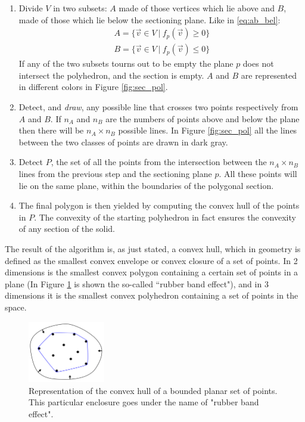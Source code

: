     \begin{enumerate}
        \item Divide $V$ in two subsets: $A$ made of those vertices which lie above and $B$, made of those which lie below the sectioning plane. Like in \ref{eq:ab_bel}:
        \begin{align}
            A = \{ \vec v \in V \ |\ f_p(\vec v)\geq 0\} \label{eq:ab_bel} \\
            B = \{ \vec v \in V \ |\ f_p(\vec v)\leq 0\} \nonumber
        \end{align}
        If any of the two subsets tourns out to be empty the plane $p$ does not intersect the polyhedron, and the section is empty. $A$ and $B$ are represented in different colors in Figure \ref{fig:sec_pol}.

        \item Detect, and \textit{draw}, any possible line that crosses two points respectively from $A$ and $B$. If $n_A$ and $n_B$ are the numbers of points above and below the plane then there will be $n_A \times n_B$ possible lines. In Figure \ref{fig:sec_pol} all the lines between the two classes of points are drawn in dark gray.

        \item Detect $P$, the set of all the points from the intersection between the $n_A \times n_B$ lines from the previous step and the sectioning plane $p$. All these points will lie on the same plane, within the boundaries of the polygonal section.

        \item The final polygon is then yielded by computing the convex hull of the points in $P$. The convexity of the starting polyhedron in fact ensures the convexity of any section of the solid.
    \end{enumerate}

    The result of the algorithm is, as just stated, a convex hull, which in geometry is defined as the smallest convex envelope or convex closure of a set of points. In 2 dimensions is the smallest convex polygon containing a certain set of points in a plane (In Figure \ref{fig:conv_hull} is shown the so-called ``rubber band effect"), and in 3 dimensions it is the smallest convex polyhedron containing a set of points in the space.

    \begin{figure}
        \centering
        \includegraphics[width = 0.3\textwidth]{images/conv_hull}
        \caption{Representation of the convex hull of a bounded planar set of points. This particular enclosure goes under the name of "rubber band effect".}
        \label{fig:conv_hull}
    \end{figure}

